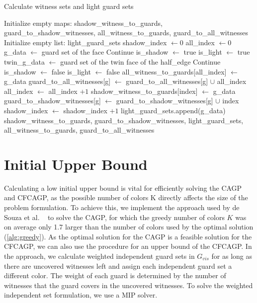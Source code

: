 \begin{algorithm}
\caption{Calculate witness sets and light guard sets}\label{alg:AVP_processing}
\begin{algorithmic}[1]
\State Initialize empty maps: shadow\_witness\_to\_guards, guard\_to\_shadow\_witnesses, all\_witness\_to\_guards, guard\_to\_all\_witnesses
\State Initialize empty list: light\_guard\_sets
\State shadow\_index $\gets 0$
\State all\_index $\gets 0$
    \State g\_data $\gets$ guard set of the face
        \State Continue
    \EndIf
    \State is\_shadow $\gets$ true
    \State is\_light $\gets$ true
        \State twin\_g\_data $\gets$ guard set of the twin face of the half\_edge
            \State Continue
        \EndIf
            \State is\_shadow $\gets$ false
        \EndIf
            \State is\_light $\gets$ false
        \EndIf
    \EndFor
    \State all\_witness\_to\_guards[all\_index] $\gets$ g\_data
        \State guard\_to\_all\_witnesses[g] $\gets$ guard\_to\_all\_witnesses[g] $\cup$ all\_index
    \EndFor
    \State all\_index $\gets$ all\_index $+ 1$
        \State shadow\_witness\_to\_guards[index] $\gets$ g\_data
            \State guard\_to\_shadow\_witnesses[g] $\gets$ guard\_to\_shadow\_witnesses[g] $\cup$ index
        \EndFor
        \State shadow\_index $\gets$ shadow\_index $+ 1$
    \EndIf
        \State light\_guard\_sets.append(g\_data)
    \EndIf
\EndFor
\State \Return shadow\_witness\_to\_guards, guard\_to\_shadow\_witnesses, light\_guard\_sets, all\_witness\_to\_guards, guard\_to\_all\_witnesses
\EndProcedure
\end{algorithmic}
\end{algorithm}

\section{Initial Upper Bound}
Calculating a low initial upper bound is vital for efficiently solving the CAGP and CFCAGP, as the possible number of colors K directly affects the size of the problem formulation. To achieve this, we implement the approach used by de Souza et al. ~\cite{zambon2014exact} to solve the CAGP, for which the greedy number of colors $K$ was on average only 1.7 larger than the number of colors used by the optimal solution (\cref{alg:greedy}). As the optimal solution for the CAGP is a feasible solution for the CFCAGP, we can also use the procedure for an upper bound of the CFCAGP. In the approach, we calculate weighted independent guard sets in $G_{vis}$ for as long as there are uncovered witnesses left and assign each independent guard set a different color. The weight of each guard is determined by the number of witnesses that the guard covers in the uncovered witnesses. To solve the weighted independent set formulation, we use a MIP solver.

